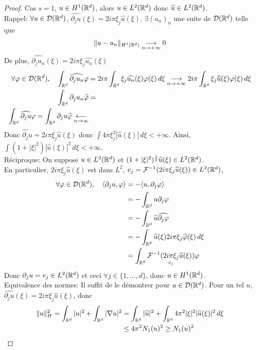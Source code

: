 \documentclass[]{report}
\begin{document}
    \begin{proof}
        Cas $s=1$, $u\in H^1(\mathbb{R}^d)$, alors $u\in L^2(\mathbb{R}^d)$ donc $\widehat{u}\in L^2(\mathbb{R}^d)$.\\
        Rappel: $\forall u\in \mathcal{D}(\mathbb{R}^d)$, $\widehat{\partial_j u}(\xi)=2i \pi \xi_j \widehat{u}(\xi)$. $\exists (u_n)_n$ une suite de $\mathcal{D}(\mathbb{R}^d)$ telle que
        \[\lVert u-u_n \rVert_{H^1(\mathbb{R}^d)}\underset{n\to +\infty}{\longrightarrow} 0\]
        De plus, $\widehat{\partial_j u_n}(\xi)=2i\pi \xi_j \widehat{u_n}(\xi)$
        \begin{align*}
            \forall \varphi\in \mathcal{D}(\mathbb{R}^d),\quad \int_{\mathbb{R}^d}\widehat{\partial_j u_n}\varphi&=2i\pi \int_{\mathbb{R}^d} \xi_j \widehat{u_n}(\xi)\varphi(\xi)\, d\xi\underset{n\to +\infty}{\longrightarrow} 2i\pi \int_{\mathbb{R}^d}\xi_j \widehat{u}(\xi)\varphi(\xi)\, d\xi\\
            \int_{\mathbb{R}^d}\partial_j u_n\widehat{\varphi} &=\\
            \int_{\mathbb{R}^d}\widehat{\partial_j u}\varphi=\int_{\mathbb{R}^d}\partial_j u\widehat{\varphi}\underset{n\to \infty}{\longleftarrow}&
        \end{align*}
        Donc $\widehat{\partial_j}u=2i\pi \xi_j \widehat{u}(\xi)$ donc $\int 4\pi \xi_j^2 |\widehat{u}(\xi)|\, d\xi<+\infty$. Ainsi, $\int(1+|\xi|^2)|\widehat{u}(\xi)|^2\, d\xi<+\infty$.\\
        Réciproque: On suppose $u\in L^2(\mathbb{R}^d)$ et $(1+|\xi|^2)^{\frac{1}{2}}\widehat{u}(\xi)\in L^2(\mathbb{R}^d)$.\\
        En particulier, $2i\pi \xi_j \widehat{u}(\xi)$ est dans $L^2$, $v_j=\mathcal{F}^{-1}(2i\pi \xi_j \widehat{u}(\xi))\in L^2(\mathbb{R}^d)$,
        \begin{align*}
            \forall \varphi\in \mathcal{D}(\mathbb{R}^d),\quad \langle \partial_j u,\varphi \rangle&=-\langle u,\partial_j \varphi \rangle\\
            &=-\int_{\mathbb{R}^d}u\partial_j \varphi\\
            &=-\int_{\mathbb{R}^d}\widehat{u}\widehat{\partial_j \varphi}\\
            &=-\int_{\mathbb{R}^d}\widehat{u}(\xi)2i\pi \xi_j \widehat{\varphi}(\xi)\, d\xi\\
            &=\int_{\mathbb{R}^d}\underset{v_j}{\mathcal{F}^{-1}(2i\pi \xi_j \widehat{u}(\xi))}\varphi
        \end{align*}
        Donc $\partial_j u=v_j\in L^2(\mathbb{R}^d)$ et ceci $\forall j\in \{1,\ldots,d\}$, donc $u\in H^1(\mathbb{R}^d)$.\\
        Equivalence des normes: Il suffit de le démontrer pour $u\in \mathcal{D}(\mathbb{R}^d)$. Pour un tel $u$, $\widehat{\partial_j u}(\xi)=2i\pi \xi_j \widehat{u}(\xi)$, donc
        \begin{align*}
            \lVert u \rVert_{H}^2=\int_{\mathbb{R}^d}|u|^2+\int_{\mathbb{R}^d}|\nabla u|^2&=\int_{\mathbb{R}^d}|\widehat{u}|^2+\int_{\mathbb{R}^d}4\pi^2|\xi|^2 |\widehat{u}(\xi)|^2\, d\xi\\
            &\le 4\pi^2N_1(u)^2\ge N_1(u)^2
        \end{align*}
    \end{proof}
\end{document}
